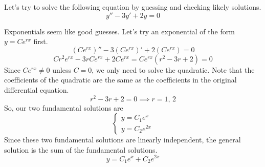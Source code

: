 \begin{example}
	Let's try to solve the following equation by guessing and checking likely solutions.
	\begin{equation*}
		y'' - 3y' + 2y = 0
	\end{equation*}
\end{example}
\noindent
Exponentials seem like good guesses. Let's try an exponential of the form $y = Ce^{rx}$ first.
\begin{equation*}
	\left(Ce^{rx}\right)'' - 3\left(Ce^{rx}\right)' + 2\left(Ce^{rx}\right) =  0
\end{equation*}
\begin{equation*}
	Cr^2e^{rx} - 3rCe^{rx} + 2Ce^{rx} = Ce^{rx}\left(r^2 - 3r + 2\right) = 0
\end{equation*}
Since $Ce^{rx} \neq 0$ unless $C = 0$, we only need to solve the quadratic. Note that the coefficients of the quadratic are the same as the coefficients in the original differential equation.
\begin{equation*}
	r^2 - 3r + 2 = 0 \implies r = 1 \text{, } 2
\end{equation*}
So, our two fundamental solutions are
\begin{equation*}
	\begin{cases}
		y = C_1e^{x} \\
		y = C_2e^{2x}
	\end{cases}
\end{equation*}
Since these two fundamental solutions are linearly independent, the general solution is the sum of the fundamental solutions.
\begin{equation*}
	y = C_1e^{x} + C_2e^{2x}
\end{equation*}